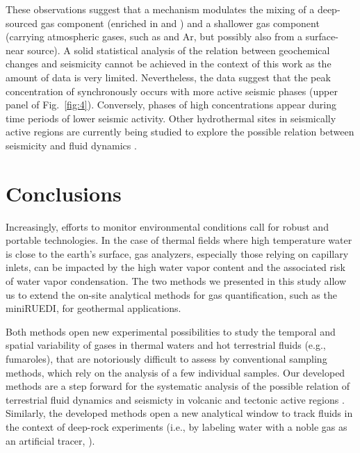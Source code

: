 These observations suggest that a mechanism modulates the mixing of a deep-sourced gas component (enriched in  and ) and a shallower gas component (carrying atmospheric gases, such as  and Ar, but possibly also  from a surface-near source).
A solid statistical analysis of the relation between geochemical changes and seismicity cannot be achieved in the context of this work as the amount of data is very limited. 
Nevertheless, the data suggest that the peak concentration of  synchronously occurs with more active seismic phases (upper panel of Fig.~\ref{fig:4}).
Conversely, phases of high  concentrations appear during time periods of lower seismic activity.
Other hydrothermal sites in seismically active regions are currently being studied to explore the possible relation between seismicity and fluid dynamics \citep{giroud2022monitoring}.

\section{Conclusions}
Increasingly, efforts to monitor environmental conditions call for robust and portable technologies.
In the case of thermal fields where high temperature water is close to the earth's surface, gas analyzers, especially those relying on capillary inlets, can be impacted by the high water vapor content and the associated risk of water vapor condensation.
The two methods we presented in this study allow us to extend the on-site analytical methods for gas quantification, such as the miniRUEDI, for geothermal applications.

Both methods open new experimental possibilities to study the temporal and spatial variability of gases in thermal waters and hot terrestrial fluids (e.g., fumaroles), that are notoriously difficult to assess by conventional sampling methods, which rely on the analysis of a few individual samples.
Our developed methods are a step forward for the systematic analysis of the possible relation of terrestrial fluid dynamics and seismicty in volcanic and tectonic active regions \citep{giroud2022monitoring}.
Similarly, the developed methods open a new analytical window to track fluids in the context of deep-rock experiments (i.e., by labeling water with a noble gas as an artificial tracer, \cite{zappone2021fault, roques2020helium}).


\cleardoublepage
